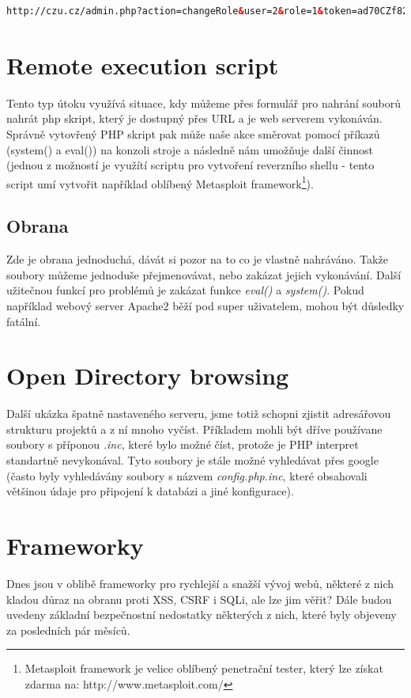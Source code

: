\documentclass[12pt, a4paper]{report}
\begin{document}
\begin{lstlisting}[label=token_url,language=HTML, caption=CSFR obrana - token]
http://czu.cz/admin.php?action=changeRole&user=2&role=1&token=ad70CZf82
\end{lstlisting}

\section{Remote execution script}
Tento typ útoku využívá situace, kdy můžeme přes formulář pro nahrání souborů nahrát php skript, který je dostupný přes URL a je web serverem vykonáván. Správně vytovřený PHP skript pak může naše akce směrovat pomocí příkazů (system() a eval()) na konzoli stroje a následně nám umožňuje další činnost (jednou z možností je využítí scriptu pro vytvoření reverzního shellu - tento script umí vytvořit například oblíbený Metasploit framework\footnote{Metasploit framework je velice oblíbený penetrační tester, který lze získat zdarma na: http://www.metasploit.com/}).

\subsection{Obrana}
Zde je obrana jednoduchá, dávát si pozor na to co je vlastně nahráváno. Takže soubory můžeme jednoduše přejmenovávat, nebo zakázat jejich vykonávání. Další užitečnou funkcí pro  problémů je zakázat funkce \textit{eval()} a \textit{system()}. Pokud například webový server Apache2 běží pod super uživatelem, mohou být důsledky fatální.

\section{Open Directory browsing}
Další ukázka špatně nastaveného serveru, jsme totiž schopni zjistit adresářovou strukturu projektů a z ní mnoho vyčíst. Příkladem mohli být dříve používane soubory s příponou \textit{.inc}, které bylo možné číst, protože je PHP interpret standartně nevykonával. Tyto soubory je stále možné vyhledávat přes google (často byly vyhledávány soubory s názvem \textit{config.php.inc}, které obsahovali většinou údaje pro připojení k databázi a jiné konfigurace).

\section{Frameworky}
Dnes jsou v oblibě frameworky pro rychlejší a snažší vývoj webů, některé z nich kladou důraz na obranu proti XSS, CSRF i SQLi, ale lze jim věřit? Dále budou uvedeny základní bezpečnostní nedostatky některých z nich, které byly objeveny za posledních pár měsíců.
\end{document}
